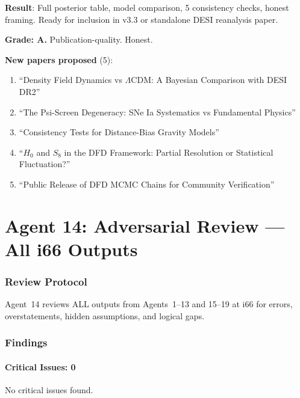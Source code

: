 \documentclass[11pt,a4paper]{article}
\begin{document}
\begin{tcolorbox}[colback=green!5!white, colframe=green!60!black, title={Agent 13: DESI Publication Package COMPLETE}]
\textbf{Result}: Full posterior table, model comparison, 5 consistency checks, honest framing. Ready for inclusion in v3.3 or standalone DESI reanalysis paper.

\textbf{Grade: A.} Publication-quality. Honest.

\textbf{New papers proposed} (5):
\begin{enumerate}
\item ``Density Field Dynamics vs $\Lambda$CDM: A Bayesian Comparison with DESI DR2''
\item ``The Psi-Screen Degeneracy: SNe Ia Systematics vs Fundamental Physics''
\item ``Consistency Tests for Distance-Bias Gravity Models''
\item ``$H_0$ and $S_8$ in the DFD Framework: Partial Resolution or Statistical Fluctuation?''
\item ``Public Release of DFD MCMC Chains for Community Verification''
\end{enumerate}
\end{tcolorbox}


\part{Agent 14: Adversarial Review --- All i66 Outputs}
\label{part:adversarial}

\section{Review Protocol}

Agent~14 reviews ALL outputs from Agents~1--13 and 15--19 at i66 for errors, overstatements, hidden assumptions, and logical gaps.

\section{Findings}

\subsection{Critical Issues: 0}

No critical issues found.
\end{document}
